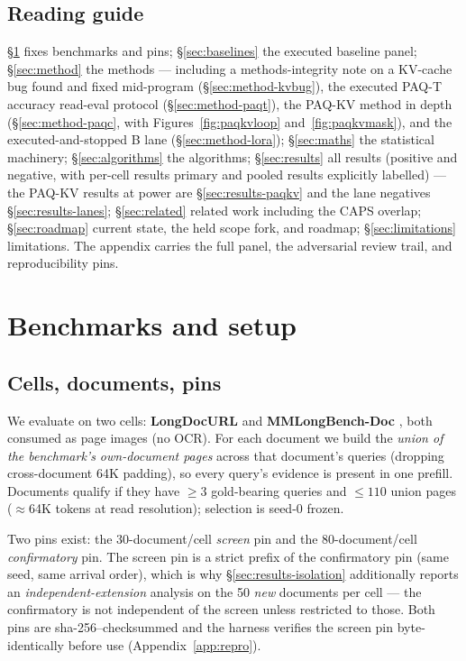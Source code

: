 \documentclass[11pt,letterpaper]{article}
\newcommand{\paqt}{\textsc{PAQ-T}}
\newcommand{\paqc}{\textsc{PAQ-KV}}
\begin{document}
\subsection{Reading guide}
\S\ref{sec:setup} fixes benchmarks and pins; \S\ref{sec:baselines} the executed baseline panel;
\S\ref{sec:method} the methods --- including a methods-integrity note on a KV-cache bug found
and fixed mid-program (\S\ref{sec:method-kvbug}), the executed \paqt{} accuracy read-eval
protocol (\S\ref{sec:method-paqt}), the \paqc{} method in depth
(\S\ref{sec:method-paqc}, with Figures~\ref{fig:paqkvloop} and~\ref{fig:paqkvmask}), and the
executed-and-stopped B lane (\S\ref{sec:method-lora}); \S\ref{sec:maths} the statistical
machinery; \S\ref{sec:algorithms} the algorithms; \S\ref{sec:results} all results (positive and
negative, with per-cell results primary and pooled results explicitly labelled) --- the \paqc{}
results at power are \S\ref{sec:results-paqkv} and the lane negatives
\S\ref{sec:results-lanes}; \S\ref{sec:related} related work including the CAPS overlap;
\S\ref{sec:roadmap} current state, the held scope fork, and roadmap; \S\ref{sec:limitations}
limitations. The appendix carries the full panel, the adversarial review trail, and
reproducibility pins.

\section{Benchmarks and setup}\label{sec:setup}

\subsection{Cells, documents, pins}
We evaluate on two cells: \textbf{LongDocURL} \citep{deng2025longdocurl} and
\textbf{MMLongBench-Doc} \citep{ma2024mmlongbench}, both consumed as page images (no OCR).
For each document we build the \emph{union of the benchmark's own-document pages} across that
document's queries (dropping cross-document 64K padding), so every query's evidence is present in
one prefill. Documents qualify if they have $\geq 3$ gold-bearing queries and $\leq 110$ union
pages ($\approx$64K tokens at read resolution); selection is seed-0 frozen.

Two pins exist: the 30-document/cell \emph{screen} pin and the 80-document/cell
\emph{confirmatory} pin. The screen pin is a strict prefix of the confirmatory pin (same seed,
same arrival order), which is why \S\ref{sec:results-isolation} additionally reports an
\emph{independent-extension} analysis on the 50 \emph{new} documents per cell --- the confirmatory
is not independent of the screen unless restricted to those. Both pins are sha-256--checksummed
and the harness verifies the screen pin byte-identically before use (Appendix~\ref{app:repro}).
\end{document}
